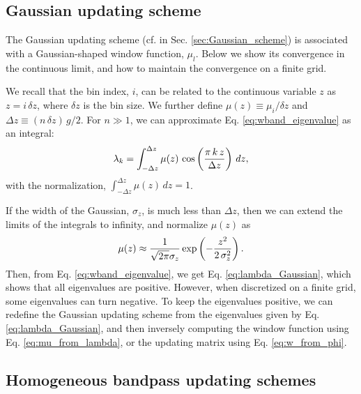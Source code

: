 \documentclass[reprint, superscriptaddress, floatfix]{revtex4-1}
\begin{document}
\subsection{\label{sec:Gaussian_math}
Gaussian updating scheme}



The Gaussian updating scheme (cf. in Sec. \ref{sec:Gaussian_scheme})
is associated with a Gaussian-shaped window function, $\mu_l$.
%
%
Below we show its convergence
in the continuous limit,
and how to maintain the convergence
on a finite grid.



We recall that
the bin index, $i$, can be related to
the continuous variable $z$ as
$z = i \, \delta z$,
where
$\delta z$ is the bin size.
%
We further define
$\mu(z) \equiv \mu_i/\delta z$
and
$\Delta z \equiv (n \, \delta z) \, g / 2$.
%
For $n \gg 1$,
we can approximate Eq. \eqref{eq:wband_eigenvalue}
as an integral:
%
\begin{equation}
  \lambda_k
  =
  \int_{-\Delta z}^{\Delta z}
    \mu(z) \, \cos\left( \frac{ \pi \, k \, z } { \Delta z} \right)
    \, d z,
  \notag
\end{equation}
%
with the normalization,
$\int_{-\Delta z}^{\Delta z} \mu(z) \, dz = 1$.

If the width of the Gaussian, $\sigma_z$,
is much less than $\Delta z$,
then we can extend the limits of the integrals
to infinity, and normalize $\mu(z)$ as
%
\begin{equation}
  \mu(z)
  \approx
  \frac{            1            }
       { \sqrt{ 2 \pi } \sigma_z }
  \exp\left(
        -\frac{   z^2   }
              { 2 \, \sigma_z^2 }
      \right)
  .
\notag
\end{equation}
%
Then, from Eq. \eqref{eq:wband_eigenvalue},
we get Eq. \eqref{eq:lambda_Gaussian},
which shows that all eigenvalues are positive.
%
However,
when discretized on a finite grid,
some eigenvalues can turn negative.
%
To keep the eigenvalues positive,
we can redefine the Gaussian updating scheme
from the eigenvalues given by Eq. \eqref{eq:lambda_Gaussian},
and then inversely computing the window function
using Eq. \eqref{eq:mu_from_lambda},
or the updating matrix using Eq. \eqref{eq:w_from_phi}.




\subsection{\label{sec:homo_bandpass}
Homogeneous bandpass updating schemes}
\end{document}
